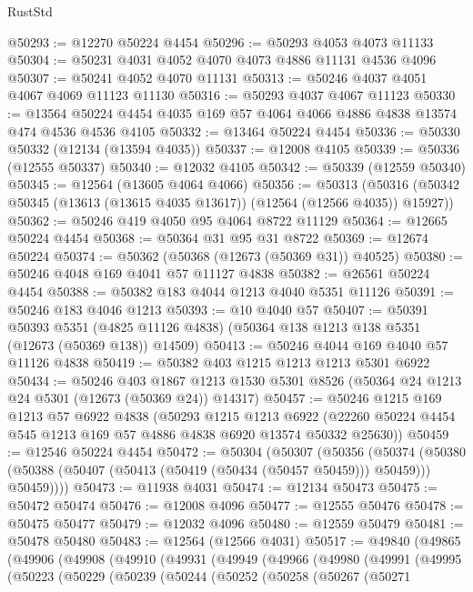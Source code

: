 \begin{lexlean}{RustStd}
\begin{coremodule}
{\begin{coremodule}
{{{{{{{{{{{{{{{{{{{{{{{{{{{{{{{{{{{{{{{{{{{{{{{{{{{{{{{{{{{{{{{{{{{{{{{{{{{{{{{{@50293 := @12270 @50224 @4454
@50296 := @50293 @4053 @4073 @11133
@50304 := @50231 @4031 @4052 @4070 @4073 @4886 @11131 @4536 @4096
@50307 := @50241 @4052 @4070 @11131
@50313 := @50246 @4037 @4051 @4067 @4069 @11123 @11130
@50316 := @50293 @4037 @4067 @11123
@50330 := @13564 @50224 @4454 @4035 @169 @57 @4064 @4066 @4886 @4838 @13574 @474 @4536 @4536 @4105
@50332 := @13464 @50224 @4454
@50336 := @50330 @50332 (@12134 (@13594 @4035))
@50337 := @12008 @4105
@50339 := @50336 (@12555 @50337)
@50340 := @12032 @4105
@50342 := @50339 (@12559 @50340)
@50345 := @12564 (@13605 @4064 @4066)
@50356 := @50313
    (@50316 (@50342 @50345 (@13613 (@13615 @4035 @13617)) (@12564 (@12566 @4035)) @15927))
@50362 := @50246 @419 @4050 @95 @4064 @8722 @11129
@50364 := @12665 @50224 @4454
@50368 := @50364 @31 @95 @31 @8722
@50369 := @12674 @50224
@50374 := @50362 (@50368 (@12673 (@50369 @31)) @40525)
@50380 := @50246 @4048 @169 @4041 @57 @11127 @4838
@50382 := @26561 @50224 @4454
@50388 := @50382 @183 @4044 @1213 @4040 @5351 @11126
@50391 := @50246 @183 @4046 @1213
@50393 := @10 @4040 @57
@50407 := @50391
    @50393
    @5351
    (@4825 @11126 @4838)
    (@50364 @138 @1213 @138 @5351 (@12673 (@50369 @138)) @14509)
@50413 := @50246 @4044 @169 @4040 @57 @11126 @4838
@50419 := @50382 @403 @1215 @1213 @1213 @5301 @6922
@50434 := @50246
    @403
    @1867
    @1213
    @1530
    @5301
    @8526
    (@50364 @24 @1213 @24 @5301 (@12673 (@50369 @24)) @14317)
@50457 := @50246
    @1215
    @169
    @1213
    @57
    @6922
    @4838
    (@50293
      @1215
      @1213
      @6922
      (@22260 @50224 @4454 @545 @1213 @169 @57 @4886 @4838 @6920 @13574 @50332 @25630))
@50459 := @12546 @50224 @4454
@50472 := @50304
    (@50307
      (@50356
        (@50374
          (@50380 (@50388 (@50407 (@50413 (@50419 (@50434 (@50457 @50459))) @50459))) @50459))))
@50473 := @11938 @4031
@50474 := @12134 @50473
@50475 := @50472 @50474
@50476 := @12008 @4096
@50477 := @12555 @50476
@50478 := @50475 @50477
@50479 := @12032 @4096
@50480 := @12559 @50479
@50481 := @50478 @50480
@50483 := @12564 (@12566 @4031)
@50517 := @49840
    (@49865
      (@49906
        (@49908
          (@49910
            (@49931
              (@49949
                (@49966
                  (@49980
                    (@49991
                      (@49995
                        (@50223
                          (@50229
                            (@50239
                              (@50244
                                (@50252
                                  (@50258
                                    (@50267
                                      (@50271
}}}}}}}}}}}}}}}}}}}}}}}}}}}}}}}}}}}}}}}}}}}}}}}}}}}}}}}}}}}}}}}}}}}}}}}}}}}}}}}}
\end{coremodule}}
\end{coremodule}
\end{lexlean}
